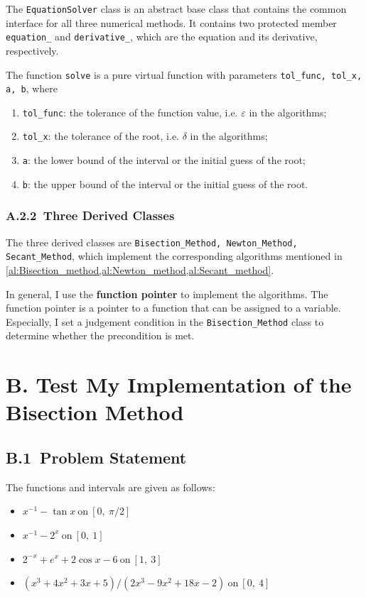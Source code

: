 \documentclass[a4paper]{article}
\begin{document}
The \verb|EquationSolver| class is an abstract base class that contains the common interface for all three numerical methods. 
It contains two protected member \verb|equation_| and \verb|derivative_|, which are the equation and its derivative, respectively. 

The function \verb|solve| is a pure virtual function with parameters \verb|tol_func, tol_x, a, b|, where 
\begin{enumerate}
  \item \verb|tol_func|: the tolerance of the function value, i.e. $\varepsilon$ in the algorithms;
  \item \verb|tol_x|: the tolerance of the root, i.e. $\delta$ in the algorithms;
  \item \verb|a|: the lower bound of the interval or the initial guess of the root;
  \item \verb|b|: the upper bound of the interval or the initial guess of the root.
\end{enumerate}

\subsubsection*{A.2.2\ Three Derived Classes}

The three derived classes are \verb|Bisection_Method, Newton_Method, Secant_Method|, which implement the corresponding algorithms mentioned in \cref{al:Bisection_method,al:Newton_method,al:Secant_method}.

In general, I use the \textbf{function pointer} to implement the algorithms. The function pointer is a pointer to a function that can be assigned to a variable. 
Especially, I set a judgement condition in the \verb|Bisection_Method| class to determine whether the precondition is met.

\section*{B. Test My Implementation of the Bisection Method}

\subsection*{B.1\ Problem Statement}

The functions and intervals are given as follows:
\begin{itemize}
  \item $x^{-1} - \tan x \ \mathrm{on} \ [0,\ \pi/2]$
  \item $x^{-1} - 2^x \ \mathrm{on} \ [0,\ 1]$
  \item $2^{-x} + e^x + 2 \cos x - 6 \ \mathrm{on} \ [1,\ 3]$
  \item $(x^3 + 4x^2 + 3x + 5)/(2x^3 - 9x^2 + 18x - 2) \ \mathrm{on} \ [0,\ 4]$
\end{itemize}
\end{document}
